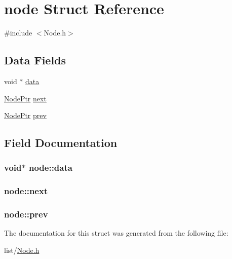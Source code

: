 \hypertarget{structnode}{\section{node Struct Reference}
\label{structnode}
}


{\ttfamily \#include $<$Node.\-h$>$}

\subsection*{Data Fields}
\begin{DoxyCompactItemize}
\item 
void $\ast$ \hyperlink{structnode_ae82853bbf3b0d2b71de205ae40799555}{data}
\item 
\hyperlink{Node_8h_aa6eec21621b8638e350fd0ec238a9715}{Node\-Ptr} \hyperlink{structnode_a29ed78f5e5f0fea79b113e047d18997d}{next}
\item 
\hyperlink{Node_8h_aa6eec21621b8638e350fd0ec238a9715}{Node\-Ptr} \hyperlink{structnode_a8f67d90e34c478e9dd9a5bd51574c8c4}{prev}
\end{DoxyCompactItemize}


\subsection{Field Documentation}
\hypertarget{structnode_ae82853bbf3b0d2b71de205ae40799555}{
\subsubsection[{data}]{\setlength{\rightskip}{0pt plus 5cm}void$\ast$ node\-::data}}\label{structnode_ae82853bbf3b0d2b71de205ae40799555}
\hypertarget{structnode_a29ed78f5e5f0fea79b113e047d18997d}{
\subsubsection[{next}]{ node\-::next}}\label{structnode_a29ed78f5e5f0fea79b113e047d18997d}
\hypertarget{structnode_a8f67d90e34c478e9dd9a5bd51574c8c4}{
\subsubsection[{prev}]{ node\-::prev}}\label{structnode_a8f67d90e34c478e9dd9a5bd51574c8c4}


The documentation for this struct was generated from the following file\-:\begin{DoxyCompactItemize}
\item 
list/\hyperlink{Node_8h}{Node.\-h}\end{DoxyCompactItemize}
